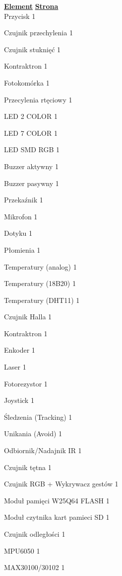 \documentclass[11pt, a4paper]{article}
\begin{document}
%
%
\mainpagenoimage

\newpage

\tableofcontents

\pagestyle{empty}

\textbf{\underline{Element}}
\hfill
\textbf{\underline{Strona}} \\

Przycisk
\hfill
1

Czujnik przechylenia
\hfill
1

Czujnik stuknięć
\hfill
1

Kontraktron
\hfill
1

Fotokomórka
\hfill
1

Przecylenia rtęciowy
\hfill
1

LED 2 COLOR
\hfill
1

LED 7 COLOR
\hfill
1

LED SMD RGB
\hfill
1

Buzzer aktywny
\hfill
1

Buzzer pasywny
\hfill
1

Przekaźnik
\hfill
1

Mikrofon
\hfill
1

Dotyku
\hfill
1

Płomienia
\hfill
1

Temperatury (analog)
\hfill
1

Temperatury (18B20)
\hfill
1

Temperatury (DHT11)
\hfill
1

Czujnik Halla
\hfill
1

Kontraktron
\hfill
1

Enkoder
\hfill
1

Laser
\hfill
1

Fotorezystor
\hfill
1

Joystick
\hfill
1

Śledzenia (Tracking)
\hfill
1

Unikania (Avoid)
\hfill
1

Odbiornik/Nadajnik IR
\hfill
1

Czujnik tętna
\hfill
1

Czujnik RGB + Wykrywacz gestów
\hfill
1

Moduł pamięci W25Q64 FLASH
\hfill
1

Moduł czytnika kart pamieci SD
\hfill
1

Czujnik odległości
\hfill
1

MPU6050
\hfill
1

MAX30100/30102
\hfill
1
\end{document}
